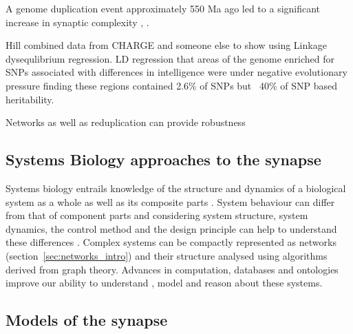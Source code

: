 A genome duplication event approximately 550 Ma ago led to a significant increase in synaptic complexity \cite{nithianantharajah2013synaptic} , \cite{grant2016molecular}.


Hill combined data from CHARGE and someone else to show using Linkage dysequlibrium regression. LD regression that areas of the genome enriched for SNPs associated with differences in intelligence were under negative evolutionary pressure finding these regions contained 2.6\% of SNPs but ~40\% of SNP based heritability. \cite{hill2016molecular} 

Networks as well as reduplication can provide robustness



 

\subsection{Systems Biology approaches to the synapse}

Systems biology entrails knowledge of the structure and dynamics of a biological system as a whole as well as its composite parts \cite{kitano2002systems}. System behaviour can differ from that of component parts and considering system structure, system dynamics, the control method and the design principle can help to understand these differences \cite{kitano2002systems}. Complex systems can be compactly represented as networks (section~\ref{sec:networks_intro}) and their structure analysed using algorithms derived from graph theory. Advances in computation, databases and ontologies improve our ability to understand , model and reason about these systems. 
 
\subsection{Models of the synapse}

